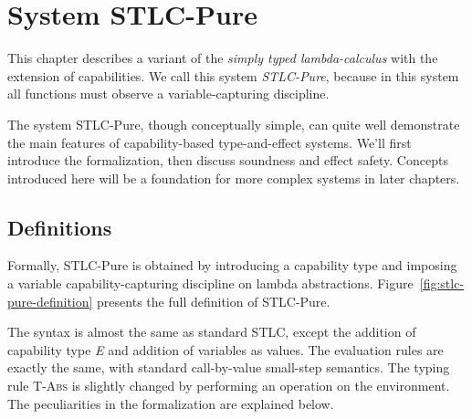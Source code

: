 \section{System STLC-Pure}

This chapter describes a variant of the \emph{simply typed
  lambda-calculus} with the extension of capabilities. We call this
system \emph{STLC-Pure}, because in this system all functions must
observe a variable-capturing discipline.


The system STLC-Pure, though conceptually simple, can quite well
demonstrate the main features of capability-based type-and-effect
systems. We'll first introduce the formalization, then discuss
soundness and effect safety. Concepts introduced here will be a
foundation for more complex systems in later chapters.

\subsection{Definitions}

Formally, STLC-Pure is obtained by introducing a capability type and
imposing a variable capability-capturing discipline on lambda
abstractions.  Figure~\ref{fig:stlc-pure-definition} presents the full
definition of STLC-Pure.

The syntax is almost the same as standard STLC, except the addition of
capability type \emph{E} and addition of variables as values. The
evaluation rules are exactly the same, with standard call-by-value
small-step semantics. The typing rule \textsc{T-Abs} is slightly
changed by performing an operation on the environment. The
peculiarities in the formalization are explained below.

